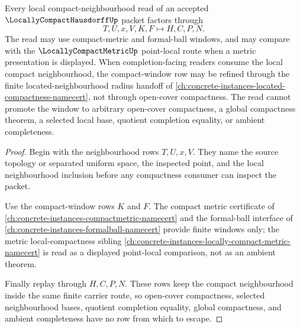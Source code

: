 \begin{theorem}
\label{thm:locally-compact-hausdorff-compact-neighbourhood-nonescape}
Every local compact-neighbourhood read of an accepted $\LocallyCompactHausdorffUp$ packet factors through
$$
T,U,x,V,K,F \longmapsto H,C,P,N .
$$
The read may use compact-metric and formal-ball windows, and may compare with the $\LocallyCompactMetricUp$ point-local route when a metric presentation is displayed. When completion-facing readers consume the local compact neighbourhood, the compact-window row may be refined through the finite located-neighbourhood radius handoff of \autoref{ch:concrete-instances-located-compactness-namecert}, not through open-cover compactness. The read cannot promote the window to arbitrary open-cover compactness, a global compactness theorem, a selected local base, quotient completion equality, or ambient completeness.
\end{theorem}
\begin{proof}
Begin with the neighbourhood rows $T,U,x,V$. They name the source topology or separated uniform space, the inspected point, and the local neighbourhood inclusion before any compactness consumer can inspect the packet.

Use the compact-window rows $K$ and $F$. The compact metric certificate of \autoref{ch:concrete-instances-compactmetric-namecert} and the formal-ball interface of \autoref{ch:concrete-instances-formalball-namecert} provide finite windows only; the metric local-compactness sibling \autoref{ch:concrete-instances-locally-compact-metric-namecert} is read as a displayed point-local comparison, not as an ambient theorem.

Finally replay through $H,C,P,N$. These rows keep the compact neighbourhood inside the same finite carrier route, so open-cover compactness, selected neighbourhood bases, quotient completion equality, global compactness, and ambient completeness have no row from which to escape.
\end{proof}

